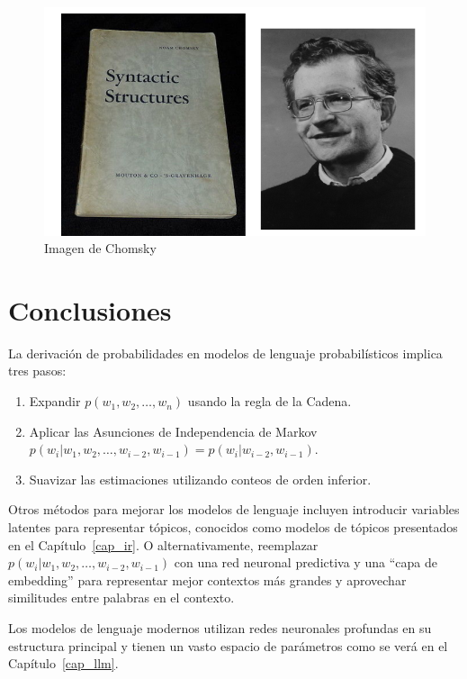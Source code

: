 \begin{figure}[h]
    \centering
    \includegraphics[scale = 0.4]{pics/chomsky.png}
    \caption{Imagen de Chomsky}
    \label{fig:chomsky}
\end{figure}


\section{Conclusiones}
La derivación de probabilidades en modelos de lenguaje probabilísticos implica tres pasos:
    \begin{enumerate}
        \item Expandir $p(w_1, w_2, \ldots, w_n)$ usando la regla de la Cadena.
        \item Aplicar las Asunciones de Independencia de Markov \\
        $p(w_i | w_1, w_2, \ldots, w_{i-2}, w_{i-1}) = p(w_i | w_{i-2}, w_{i-1})$.
        \item Suavizar las estimaciones utilizando conteos de orden inferior.
    \end{enumerate}
Otros métodos para mejorar los modelos de lenguaje incluyen introducir variables latentes para representar tópicos, conocidos como modelos de tópicos \cite{blei2003latent} presentados en el Capítulo~\ref{cap_ir}. O alternativamente, reemplazar $p(w_i | w_1, w_2, \ldots, w_{i-2}, w_{i-1})$ con una red neuronal predictiva y una ``capa de embedding'' para representar mejor contextos más grandes y aprovechar similitudes entre palabras en el contexto. \cite{bengio2000neural}

Los modelos de lenguaje modernos utilizan redes neuronales profundas en su estructura principal y tienen un vasto espacio de parámetros como se verá en el Capítulo~\ref{cap_llm}.

